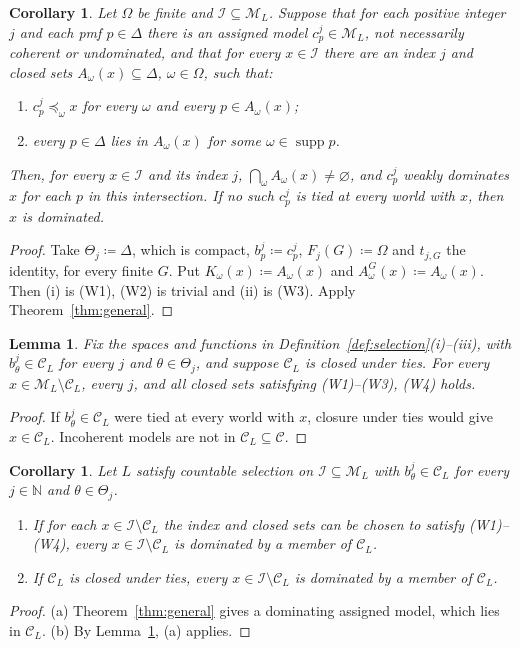 \documentclass[11pt]{article}
\newtheorem{lemma}[theorem]{Lemma}
\newtheorem{corollary}[theorem]{Corollary}
\theoremstyle{definition}
\theoremstyle{remark}
\newcommand{\M}{\mathcal M}
\newcommand{\C}{\mathcal C}
\newcommand{\I}{\mathcal I}
\newcommand{\supp}{\operatorname{supp}}
\begin{document}
\begin{corollary}\label{cor:finite}
Let $\Omega$ be finite and $\I\subseteq\M_L$. Suppose that for each positive integer $j$ and each pmf $p\in\Delta$ there is an assigned model $c^j_p\in\M_L$, not necessarily coherent or undominated, and that for every $x\in\I$ there are an index $j$ and closed sets $A_\omega(x)\subseteq\Delta$, $\omega\in\Omega$, such that:
\begin{enumerate}[label=(\roman*)]
\item $c^j_p\preceq_\omega x$ for every $\omega$ and every $p\in A_\omega(x)$;
\item every $p\in\Delta$ lies in $A_\omega(x)$ for some $\omega\in\supp p$.
\end{enumerate}
Then, for every $x\in\I$ and its index $j$, $\bigcap_\omega A_\omega(x)\ne\varnothing$, and $c^j_p$ weakly dominates $x$ for each $p$ in this intersection. If no such $c^j_p$ is tied at every world with $x$, then $x$ is dominated.
\end{corollary}
\begin{proof}
Take $\Theta_j\coloneqq\Delta$, which is compact, $b^j_p\coloneqq c^j_p$, $F_j(G)\coloneqq\Omega$ and $t_{j,G}$ the identity, for every finite $G$. Put $K_\omega(x)\coloneqq A_\omega(x)$ and $A^G_\omega(x)\coloneqq A_\omega(x)$. Then (i) is (W1), (W2) is trivial and (ii) is (W3). Apply Theorem~\ref{thm:general}.
\end{proof}

\begin{lemma}\label{lem:tie-sufficient}
Fix the spaces and functions in Definition~\ref{def:selection}(i)--(iii), with $b^j_\theta\in\C_L$ for every $j$ and $\theta\in\Theta_j$, and suppose $\C_L$ is closed under ties. For every $x\in\M_L\setminus\C_L$, every $j$, and all closed sets satisfying (W1)--(W3), (W4) holds.
\end{lemma}
\begin{proof}
If $b^j_\theta\in\C_L$ were tied at every world with $x$, closure under ties would give $x\in\C_L$. Incoherent models are not in $\C_L\subseteq\C$.
\end{proof}

\begin{corollary}\label{cor:coherent-assigned}
Let $L$ satisfy countable selection on $\I\subseteq\M_L$ with $b^j_\theta\in\C_L$ for every $j\in\mathbb N$ and $\theta\in\Theta_j$.
\begin{enumerate}[label=(\alph*)]
\item If for each $x\in\I\setminus\C_L$ the index and closed sets can be chosen to satisfy (W1)--(W4), every $x\in\I\setminus\C_L$ is dominated by a member of $\C_L$.
\item If $\C_L$ is closed under ties, every $x\in\I\setminus\C_L$ is dominated by a member of $\C_L$.
\end{enumerate}
\end{corollary}
\begin{proof}
(a) Theorem~\ref{thm:general} gives a dominating assigned model, which lies in $\C_L$. (b) By Lemma~\ref{lem:tie-sufficient}, (a) applies.
\end{proof}
\end{document}
